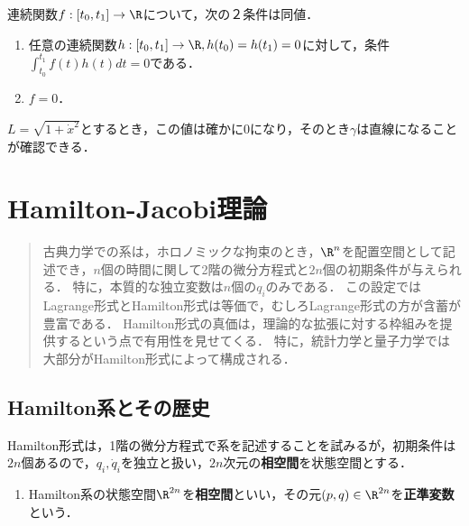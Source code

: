 \documentclass[uplatex,dvipdfmx]{jsreport}
\begin{document}
\begin{lemma}
    連続関数$f:[t_0,t_1]\to\R$について，次の２条件は同値．
    \begin{enumerate}
        \item 任意の連続関数$h:[t_0,t_1]\to\R, h(t_0)=h(t_1)=0$に対して，条件$\int^{t_1}_{t_0}f(t)h(t)dt=0$である．
        \item $f=0$．
    \end{enumerate}
\end{lemma}

\begin{example}
    $L=\sqrt{1+\dot{x}^2}$とするとき，この値は確かに$0$になり，そのとき$\gamma$は直線になることが確認できる．
\end{example}

\chapter{Hamilton-Jacobi理論}

\begin{quotation}
    古典力学での系は，ホロノミックな拘束のとき，$\R^n$を配置空間として記述でき，$n$個の時間に関して2階の微分方程式と$2n$個の初期条件が与えられる．
    特に，本質的な独立変数は$n$個の$q_i$のみである．
    この設定ではLagrange形式とHamilton形式は等価で，むしろLagrange形式の方が含蓄が豊富である．
    Hamilton形式の真価は，理論的な拡張に対する枠組みを提供するという点で有用性を見せてくる．
    特に，統計力学と量子力学では大部分がHamilton形式によって構成される．
\end{quotation}

\section{Hamilton系とその歴史}

\begin{tcolorbox}[colframe=ForestGreen, colback=ForestGreen!10!white,breakable,colbacktitle=ForestGreen!40!white,coltitle=black,fonttitle=\bfseries\sffamily,
title=]
    Hamilton形式は，1階の微分方程式で系を記述することを試みるが，初期条件は$2n$個あるので，$q_i,\dot{q}_i$を独立と扱い，$2n$次元の\textbf{相空間}を状態空間とする．
\end{tcolorbox}

\begin{definition}\mbox{}
    \begin{enumerate}
        \item Hamilton系の状態空間$\R^{2n}$を\textbf{相空間}といい，その元$(p,q)\in\R^{2n}$を\textbf{正準変数}という．
    \end{enumerate}
\end{definition}
\end{document}

